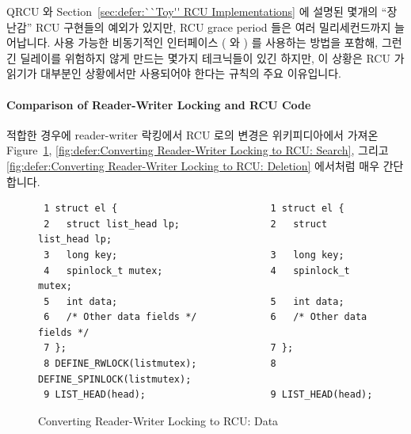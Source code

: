 QRCU 와
Section~\ref{sec:defer:``Toy'' RCU Implementations} 에 설명된 몇개의 ``장난감''
RCU 구현들의 예외가 있지만, RCU grace period 들은 여러 밀리세컨드까지
늘어납니다.
사용 가능한 비동기적인 인터페이스 ( 와 ) 를
사용하는 방법을 포함해, 그런 긴 딜레이를 위험하지 않게 만드는 몇가지 테크닉들이
있긴 하지만, 이 상황은 RCU 가 읽기가 대부분인 상황에서만 사용되어야 한다는
규칙의 주요 이유입니다.

\paragraph{Comparison of Reader-Writer Locking and RCU Code}

적합한 경우에 reader-writer 락킹에서 RCU 로의 변경은
위키피디아에서 가져온~\cite{WikipediaRCU}
Figure~\ref{fig:defer:Converting Reader-Writer Locking to RCU: Data},
\ref{fig:defer:Converting Reader-Writer Locking to RCU: Search},
그리고
\ref{fig:defer:Converting Reader-Writer Locking to RCU: Deletion}
에서처럼 매우 간단합니다.

\begin{figure}[htbp]
{ \scriptsize \centering
\begin{verbatim}
 1 struct el {                           1 struct el {
 2   struct list_head lp;                2   struct list_head lp;
 3   long key;                           3   long key;
 4   spinlock_t mutex;                   4   spinlock_t mutex;
 5   int data;                           5   int data;
 6   /* Other data fields */             6   /* Other data fields */
 7 };                                    7 };
 8 DEFINE_RWLOCK(listmutex);             8 DEFINE_SPINLOCK(listmutex);
 9 LIST_HEAD(head);                      9 LIST_HEAD(head);
\end{verbatim}
}
\caption{Converting Reader-Writer Locking to RCU: Data}
\label{fig:defer:Converting Reader-Writer Locking to RCU: Data}
\end{figure}


